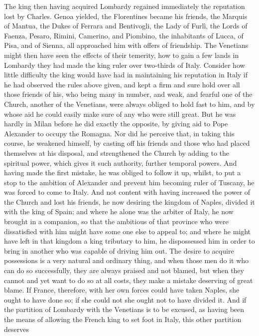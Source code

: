 \documentclass[12pt,letterpaper]{memoir}
\begin{document}
The king then having acquired Lombardy regained immediately the
reputation lost by Charles. Genoa yielded, the Florentines became his
friends, the Marquis of Mantua, the Dukes of Ferrara and Bentivogli,
the Lady of Furlì, the Lords of Faenza, Pesaro, Rimini, Camerino,
and Piombino, the inhabitants of Lucca, of Pisa, and of Sienna, all
approached him with offers of friendship. The Venetians might then
have seen the effects of their temerity, how to gain a few lands
in Lombardy they had made the king ruler over two-thirds of Italy.
Consider how little difficulty the king would have had in maintaining
his reputation in Italy if he had observed the rules above given, and
kept a firm and sure hold over all those friends of his, who being
many in number, and weak, and fearful one of the Church, another of
the Venetians, were always obliged to hold fast to him, and by whose
aid he could easily make sure of any who were still great. But he was
hardly in Milan before he did exactly the opposite, by giving aid to
Pope Alexander to occupy the Romagna. Nor did he perceive that, in
taking this course, he weakened himself, by casting off his friends
and those who had placed themselves at his disposal, and strengthened
the Church by adding to the spiritual power, which gives it such
authority, further temporal powers. And having made the first mistake,
he was obliged to follow it up, whilst, to put a stop to the ambition
of Alexander and prevent him becoming ruler of Tuscany, he was forced
to come to Italy. And not content with having increased the power
of the Church and lost his friends, he now desiring the kingdom of
Naples, divided it with the king of Spain; and where he alone was the
arbiter of Italy, he now brought in a companion, so that the ambitious
of that province who were dissatisfied with him might have some one
else to appeal to; and where he might have left in that kingdom a king
tributary to him, he dispossessed him in order to bring in another who
was capable of driving him out. The desire to acquire possessions is
a very natural and ordinary thing, and when those men do it who can
do so successfully, they are always praised and not blamed, but when
they cannot and yet want to do so at all costs, they make a mistake
deserving of great blame. If France, therefore, with her own forces
could have taken Naples, she ought to have done so; if she could not
she ought not to have divided it. And if the partition of Lombardy with
the Venetians is to be excused, as having been the means of allowing
the French king to set foot in Italy, this other partition deserves
\end{document}
